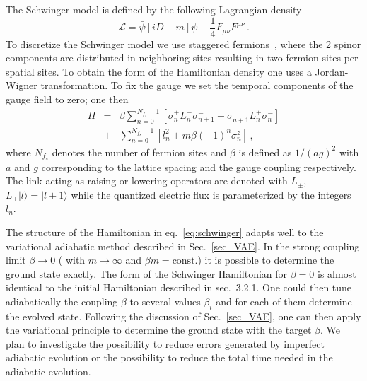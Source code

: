 \documentclass[11pt]{article}
\begin{document}
The Schwinger model is defined by the following
Lagrangian density
\begin{equation}
  \mathcal{L} = \bar\psi \left[i D - m\right]\psi - \frac{1}{4}F_{\mu\nu}F^{\mu\nu}\,.
\end{equation}  
To discretize the Schwinger model we use staggered fermions~\cite{Kogut:1974ag,Banks:1975gq}, where
the 2 spinor components are distributed in neighboring sites resulting in
two fermion sites per spatial sites.
To obtain the form of the Hamiltonian density one uses a Jordan-Wigner
transformation. To fix the gauge we set the temporal components
of the gauge field to zero; one then %
\begin{eqnarray}
H &=& \beta \sum_{n=0}^{N_{f_s}-1} \left[\sigma_n^{+} L_n^- \sigma_{n+1}^{-} +
  \sigma_{n+1}^{+} L_n^+ \sigma_{n}^{-}\right] \\ \nonumber
&+& \sum_{n=0}^{N_{f_s}-1}\left[ l_n^2 + m \beta (-1)^n \sigma_n^z\right]\,,
\label{eq:schwinger}
\end{eqnarray}
where $N_{f_s}$ denotes the number of fermion sites
and  $\beta$ is defined as $1/(ag)^2$ with $a$ and $g$ corresponding to the lattice spacing and
 the gauge coupling respectively. The link acting as raising or lowering operators are
denoted with $L_{\pm}$, $L_{\pm} |l\rangle = |l \pm 1 \rangle$
while the quantized electric flux is parameterized by the integers $l_n$.

The structure of the Hamiltonian in eq.~\eqref{eq:schwinger} adapts well to the
variational adiabatic method described in Sec.~\ref{sec_VAE}. %
In the strong coupling limit
$\beta \rightarrow 0$ ( with $m \rightarrow \infty$ and $\beta m = \textrm{const.}$)
it is possible to determine the ground state exactly.
The form of the Schwinger Hamiltonian for $\beta = 0$ is almost identical to the
initial Hamiltonian described in sec.~3.2.1. %
One could then tune adiabatically the coupling $\beta$ to several values
$\beta_i$ and for each of them determine the evolved state.
Following the discussion of Sec.~\ref{sec_VAE}, 
one can then apply the variational
principle to determine the ground state with the target $\beta$.
We plan to investigate the possibility to reduce
errors generated by imperfect adiabatic evolution 
or the possibility to reduce the
total time needed in the adiabatic evolution.

\end{document}
